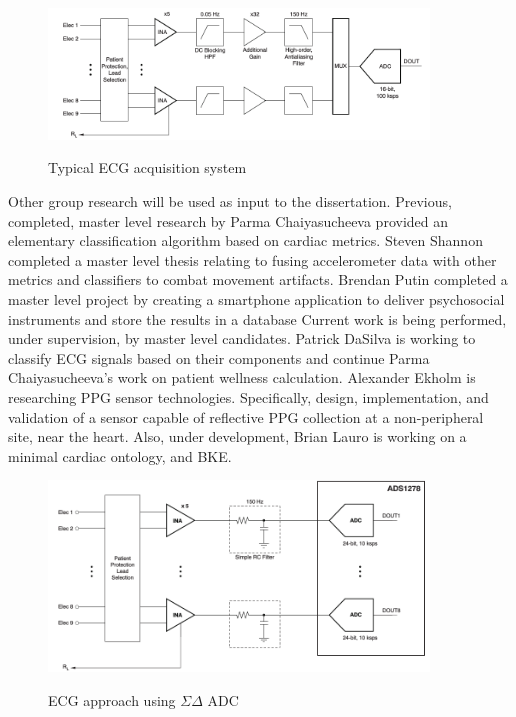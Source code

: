 \begin{figure}
	\begin{center}
		\label{fig:SAR_topology}
		\includegraphics[scale=1,width=0.9\textwidth]{Images/SAR_topology.png} 
		\caption{Typical ECG acquisition system }
	\end{center}
\end{figure}

Other group research will be used as input to the dissertation. Previous, completed, master level research by Parma Chaiyasucheeva provided an elementary classification algorithm based on cardiac metrics\cite{Chaiyasucheeva2012}. Steven Shannon completed a master level thesis relating to fusing accelerometer data with other metrics and classifiers to combat movement artifacts\cite{Shannon2012}. Brendan Putin completed a master level project by creating a smartphone application to deliver psychosocial instruments and store the results in a database  \cite{Putin2011,Louro2013} Current work is being performed, under supervision, by master level candidates. Patrick DaSilva is working to classify ECG signals based on their components and continue Parma Chaiyasucheeva's work on patient wellness calculation. Alexander Ekholm is researching PPG sensor technologies. Specifically, design, implementation, and validation of a sensor capable of reflective PPG collection at a non-peripheral site, near the heart.  Also, under development, Brian Lauro is working on a minimal cardiac ontology, and BKE.

\begin{figure}
	\begin{center}
		\label{fig:sigmaDelta_topology}
		\includegraphics[scale=1,width=0.9\textwidth]{Images/sigmaDelta_topology_simultanious.png} 
		\caption{ECG approach using $\Sigma\Delta $ ADC}
	\end{center}
\end{figure}

